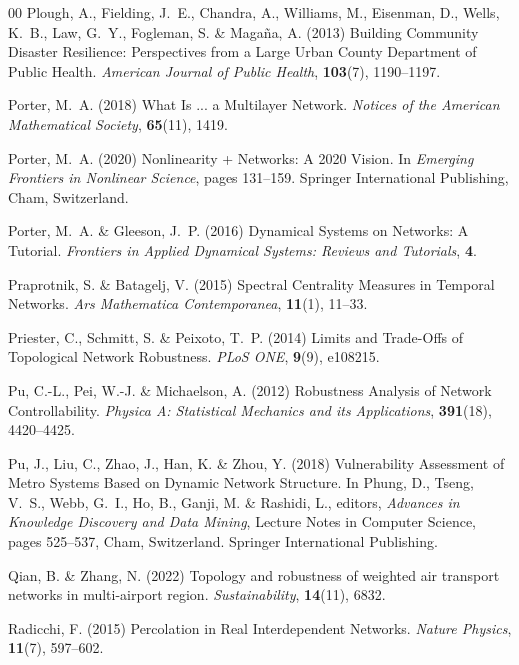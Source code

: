 \documentclass{comnet-mod}
\begin{document}
\begin{thebibliography}{00}
Plough, A., Fielding, J.~E., Chandra, A., Williams, M., Eisenman, D., Wells,
  K.~B., Law, G.~Y., Fogleman, S. {\&} Maga{\~n}a, A. (2013)  {Building
  Community Disaster Resilience: {{Perspectives}} from a Large Urban County
  Department of Public Health}. {\em {American Journal of Public Health}},
  \textbf{103}(7), 1190--1197.

Porter, M.~A. (2018)  {What Is ... a Multilayer Network}. {\em {Notices of the
  American Mathematical Society}}, \textbf{65}(11), 1419.

Porter, M.~A. (2020)  {Nonlinearity + Networks: {{A}} 2020 Vision}. In {\em
  {Emerging Frontiers in Nonlinear Science}}, pages 131--159. {Springer
  International Publishing}, {Cham, Switzerland}.

Porter, M.~A. {\&} Gleeson, J.~P. (2016)  {Dynamical Systems on Networks: A
  Tutorial}. {\em {Frontiers in Applied Dynamical Systems: Reviews and
  Tutorials}}, \textbf{4}.

Praprotnik, S. {\&} Batagelj, V. (2015)  {Spectral Centrality Measures in
  Temporal Networks}. {\em {Ars Mathematica Contemporanea}}, \textbf{11}(1),
  11--33.

Priester, C., Schmitt, S. {\&} Peixoto, T.~P. (2014)  {Limits and Trade-Offs of
  Topological Network Robustness}. {\em {PLoS ONE}}, \textbf{9}(9), e108215.

Pu, C.-L., Pei, W.-J. {\&} Michaelson, A. (2012)  {Robustness Analysis of
  Network Controllability}. {\em {Physica A: Statistical Mechanics and its
  Applications}}, \textbf{391}(18), 4420--4425.

Pu, J., Liu, C., Zhao, J., Han, K. {\&} Zhou, Y. (2018)  {Vulnerability
  {{Assessment}} of {{Metro Systems Based}} on {{Dynamic Network Structure}}}.
  In Phung, D., Tseng, V.~S., Webb, G.~I., Ho, B., Ganji, M. {\&} Rashidi, L.,
  editors, {\em {Advances in {{Knowledge Discovery}} and {{Data Mining}}}},
  Lecture {{Notes}} in {{Computer Science}}, pages 525--537, {Cham,
  Switzerland}. {Springer International Publishing}.

Qian, B. {\&} Zhang, N. (2022)  Topology and robustness of weighted air
  transport networks in multi-airport region. {\em Sustainability},
  \textbf{14}(11), 6832.

Radicchi, F. (2015)  {Percolation in Real Interdependent Networks}. {\em
  {Nature Physics}}, \textbf{11}(7), 597--602.


\end{thebibliography}
\end{document}

